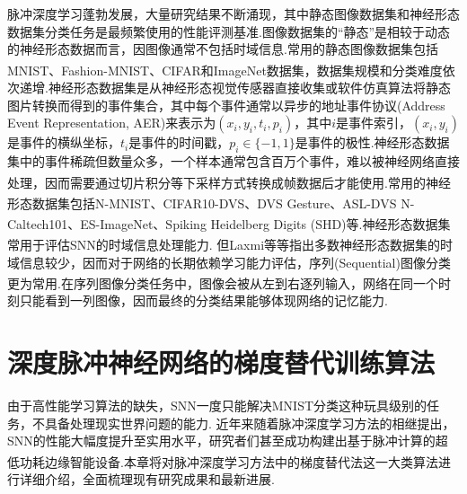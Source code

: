 \documentclass[10.5pt,compsoc,UTF8]{CjC}
\theoremstyle{mystyle}
\newcommand{\upcite}[1]{\textsuperscript{\cite{#1}}}
\begin{document}
\begin{multicols}{1}
脉冲深度学习蓬勃发展，大量研究结果不断涌现，其中静态图像数据集和神经形态数据集分类任务是最频繁使用的性能评测基准.图像数据集的“静态”是相较于动态的神经形态数据而言，因图像通常不包括时域信息.常用的静态图像数据集包括MNIST\upcite{MNIST}、Fashion-MNIST\upcite{FMNIST}、CIFAR\upcite{CIFAR10}和ImageNet\upcite{russakovsky2015imagenet}数据集，数据集规模和分类难度依次递增.神经形态数据集是从神经形态视觉传感器直接收集或软件仿真算法将静态图片转换而得到的事件集合，其中每个事件通常以异步的地址事件协议(Address Event Representation, AER)来表示为$(x_{i},y_{i},t_{i},p_{i})$，其中$i$是事件索引，$(x_{i},y_{i})$是事件的横纵坐标，$t_{i}$是事件的时间戳，$p_{i} \in \{-1, 1\}$是事件的极性.神经形态数据集中的事件稀疏但数量众多，一个样本通常包含百万个事件，难以被神经网络直接处理，因而需要通过切片积分等下采样方式转换成帧数据后才能使用\upcite{wu2018STBP, fang2021incorporating, doi:10.1126/sciadv.adi1480}.常用的神经形态数据集包括N-MNIST\upcite{10.3389/fnins.2015.00437}、CIFAR10-DVS\upcite{10.3389/fnins.2017.00309}、DVS Gesture\upcite{amir2017low}、ASL-DVS\upcite{Bi_2019_ICCV} N-Caltech101\upcite{10.3389/fnins.2015.00437}、ES-ImageNet\upcite{10.3389/fnins.2021.726582}、Spiking Heidelberg Digits (SHD)\upcite{shd}等.神经形态数据集常用于评估SNN的时域信息处理能力. 但Laxmi等\upcite{10.3389/fnins.2021.608567}等指出多数神经形态数据集的时域信息较少，因而对于网络的长期依赖学习能力评估，序列(Sequential)图像分类更为常用\upcite{yin2021accurate, fang2023parallel}.在序列图像分类任务中，图像会被从左到右逐列输入，网络在同一个时刻只能看到一列图像，因而最终的分类结果能够体现网络的记忆能力.

\section{深度脉冲神经网络的梯度替代训练算法}
由于高性能学习算法的缺失，SNN一度只能解决MNIST分类这种玩具级别的任务，不具备处理现实世界问题的能力.
近年来随着脉冲深度学习方法的相继提出，SNN的性能大幅度提升至实用水平，研究者们甚至成功构建出基于脉冲计算的超低功耗边缘智能设备\upcite{pei2019towards, Yao2024, Yang2024}.本章将对脉冲深度学习方法中的梯度替代法这一大类算法进行详细介绍，全面梳理现有研究成果和最新进展.



\end{multicols}
\end{document}

